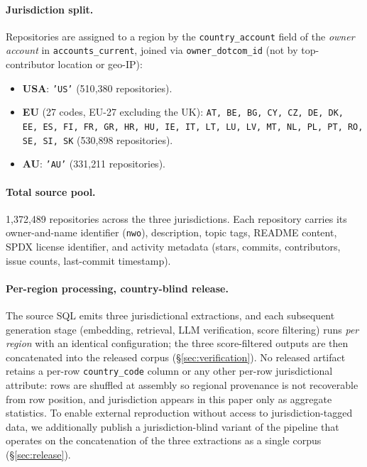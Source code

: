 \documentclass{article}
\begin{document}
\paragraph{Jurisdiction split.}
\label{sec:source:regions}
Repositories are assigned to a region by the
\texttt{country\_account} field of the \emph{owner account} in
\texttt{accounts\_current}, joined via
\texttt{owner\_dotcom\_id} (not by top-contributor location or geo-IP):
\begin{itemize}
  \item \textbf{USA}: \texttt{'US'} (510{,}380 repositories).
  \item \textbf{EU} (27 codes, EU-27 excluding the UK):
    \texttt{AT, BE, BG, CY, CZ, DE, DK, EE, ES, FI, FR, GR, HR, HU,
    IE, IT, LT, LU, LV, MT, NL, PL, PT, RO, SE, SI, SK}
    (530{,}898 repositories).
  \item \textbf{AU}: \texttt{'AU'} (331{,}211 repositories).
\end{itemize}

\paragraph{Total source pool.} 1{,}372{,}489 repositories across the
three jurisdictions. Each repository carries its owner-and-name
identifier (\texttt{nwo}), description, topic tags, README content,
SPDX license identifier, and activity metadata (stars, commits,
contributors, issue counts, last-commit timestamp).

\paragraph{Per-region processing, country-blind release.}
\label{sec:source:merge}
The source SQL emits three jurisdictional extractions, and each
subsequent generation stage (embedding, retrieval, LLM verification,
score filtering) runs \emph{per region} with an identical
configuration; the three score-filtered outputs are then concatenated
into the released corpus (\S\ref{sec:verification}). No released
artifact retains a per-row \texttt{country\_code} column or any other
per-row jurisdictional attribute: rows are shuffled at assembly so
regional provenance is not recoverable from row position, and
jurisdiction appears in this paper only as aggregate statistics. To
enable external reproduction without access to jurisdiction-tagged
data, we additionally publish a jurisdiction-blind variant of the
pipeline that operates on the concatenation of the three extractions
as a single corpus (\S\ref{sec:release}).
\end{document}
